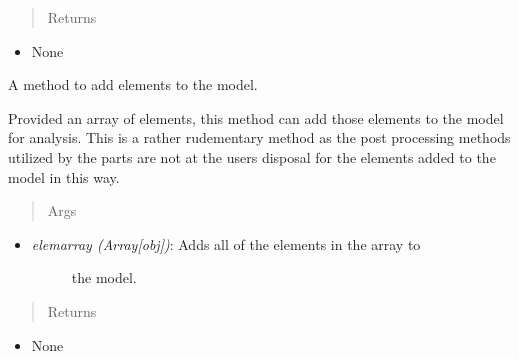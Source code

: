 \documentclass[letterpaper,10pt,english]{sphinxmanual}
\begin{document}
\begin{fulllineitems}
\begin{fulllineitems}
\begin{itemize}
\end{itemize}
\begin{quote}\begin{description}
\item[{Returns}] \leavevmode
\end{description}\end{quote}
\begin{itemize}
\item {} 
None

\end{itemize}

\end{fulllineitems}


\begin{fulllineitems}
\label{FEM:AeroComBAT.FEM.Model.addElements}
A method to add elements to the model.

Provided an array of elements, this method can add those elements to
the model for analysis. This is a rather rudementary method as the post
processing methods utilized by the parts are not at the users disposal
for the elements added to the model in this way.
\begin{quote}\begin{description}
\item[{Args}] \leavevmode
\end{description}\end{quote}
\begin{itemize}
\item {} \begin{description}
\item[{\emph{elemarray (Array{[}obj{]})}: Adds all of the elements in the array to}] \leavevmode
the model.

\end{description}

\end{itemize}
\begin{quote}\begin{description}
\item[{Returns}] \leavevmode
\end{description}\end{quote}
\begin{itemize}
\item {} 
None

\end{itemize}


\end{fulllineitems}
\end{fulllineitems}
\end{document}
